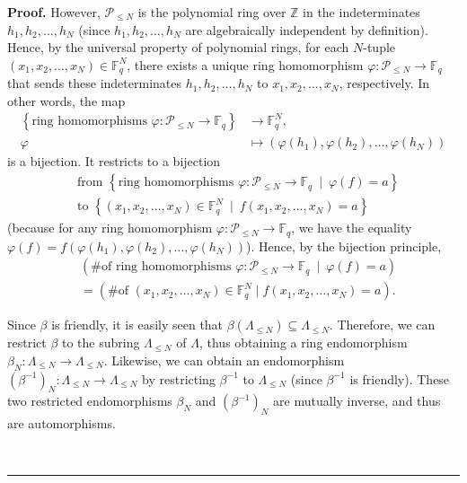 \documentclass[numbers=enddot,12pt,final,onecolumn,notitlepage]{scrartcl}%
\theoremstyle{definition}
\newenvironment{proof}[1][Proof]{\noindent\textbf{#1.} }{\ \rule{0.5em}{0.5em}}
\renewcommand{\leq}{\leqslant}
\theoremstyle{plainsl}
\begin{document}
\begin{proof}
However, $\mathcal{P}_{\leq N}$ is the polynomial ring over $\mathbb{Z}$ in
the indeterminates $h_{1},h_{2},\ldots,h_{N}$ (since $h_{1},h_{2},\ldots
,h_{N}$ are algebraically independent by definition). Hence, by the universal
property of polynomial rings, for each $N$-tuple $\left(  x_{1},x_{2}%
,\ldots,x_{N}\right)  \in\mathbb{F}_{q}^{N}$, there exists a unique ring
homomorphism $\varphi:\mathcal{P}_{\leq N}\rightarrow\mathbb{F}_{q}$ that
sends these indeterminates $h_{1},h_{2},\ldots,h_{N}$ to $x_{1},x_{2}%
,\ldots,x_{N}$, respectively. In other words, the map%
\begin{align*}
\left\{  \text{ring homomorphisms }\varphi:\mathcal{P}_{\leq N}\rightarrow
\mathbb{F}_{q}\right\}    & \rightarrow\mathbb{F}_{q}^{N},\\
\varphi & \mapsto\left(  \varphi\left(  h_{1}\right)  ,\varphi\left(
h_{2}\right)  ,\ldots,\varphi\left(  h_{N}\right)  \right)
\end{align*}
is a bijection. It restricts to a bijection
\begin{align*}
& \text{from }\left\{  \text{ring homomorphisms }\varphi:\mathcal{P}_{\leq
N}\rightarrow\mathbb{F}_{q}\ \mid\ \varphi\left(  f\right)  =a\right\}  \\
& \text{to }\left\{  \left(  x_{1},x_{2},\ldots,x_{N}\right)  \in
\mathbb{F}_{q}^{N}\ \mid\ f\left(  x_{1},x_{2},\ldots,x_{N}\right)
=a\right\}
\end{align*}
(because for any ring homomorphism $\varphi:\mathcal{P}_{\leq N}%
\rightarrow\mathbb{F}_{q}$, we have the equality
$\varphi\left(  f\right)  =f\left(
\varphi\left(  h_{1}\right)  ,\varphi\left(  h_{2}\right)  ,\ldots
,\varphi\left(  h_{N}\right)  \right)  $). Hence, by the bijection principle,%
\begin{align}
& \left(  \text{\# of ring homomorphisms }\varphi:\mathcal{P}_{\leq
N}\rightarrow\mathbb{F}_{q}\ \mid\ \varphi\left(  f\right)  =a\right)
\nonumber\\
& =\left(  \text{\# of }\left(  x_{1},x_{2},\ldots,x_{N}\right)  \in
\mathbb{F}_{q}^{N}\mid f\left(  x_{1},x_{2},\ldots,x_{N}\right)  =a\right)
.\label{pf.prop.friendly-aut.1}%
\end{align}


Since $\beta$ is friendly, it is easily seen that $\beta\left(  \Lambda_{\leq
N}\right)  \subseteq\Lambda_{\leq N}$. Therefore, we can restrict $\beta$ to
the subring $\Lambda_{\leq N}$ of $\Lambda$, thus obtaining a ring
endomorphism $\beta_{N}:\Lambda_{\leq N}\rightarrow\Lambda_{\leq N}$.
Likewise, we can obtain an endomorphism $\left(  \beta^{-1}\right)
_{N}:\Lambda_{\leq N}\rightarrow\Lambda_{\leq N}$ by restricting $\beta^{-1}$
to $\Lambda_{\leq N}$ (since $\beta^{-1}$ is friendly). These two restricted
endomorphisms $\beta_{N}$ and $\left(  \beta^{-1}\right)  _{N}$ are mutually
inverse, and thus are automorphisms.


\end{proof}
\end{document}
